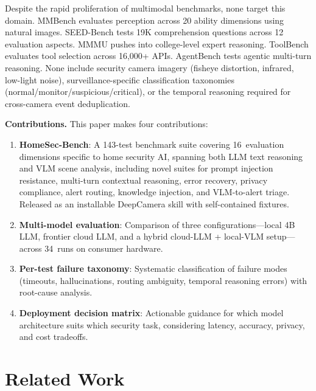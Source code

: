 \documentclass[conference]{IEEEtran}
\begin{document}
Despite the rapid proliferation of multimodal benchmarks, none target
this domain. MMBench \cite{liu2023mmbench} evaluates perception across
20 ability dimensions using natural images. SEED-Bench
\cite{li2023seedbench} tests 19K comprehension questions across 12
evaluation aspects. MMMU \cite{yue2024mmmu} pushes into
college-level expert reasoning. ToolBench \cite{qin2023toolllm} evaluates
tool selection across 16,000+ APIs. AgentBench \cite{liu2023agentbench}
tests agentic multi-turn reasoning. None include security camera imagery
(fisheye distortion, infrared, low-light noise), surveillance-specific
classification taxonomies (normal/monitor/suspicious/critical), or the
temporal reasoning required for cross-camera event deduplication.

\textbf{Contributions.} This paper makes four contributions:
\begin{enumerate}[nosep]
    \item \textbf{HomeSec-Bench}: A 143-test benchmark suite covering
    16~evaluation dimensions specific to home security AI, spanning
    both LLM text reasoning and VLM scene analysis, including novel
    suites for prompt injection resistance, multi-turn contextual
    reasoning, error recovery, privacy compliance, alert routing,
    knowledge injection, and VLM-to-alert triage. Released as an
    installable DeepCamera skill with self-contained fixtures.
    \item \textbf{Multi-model evaluation}: Comparison of three
    configurations---local 4B LLM, frontier cloud LLM, and a hybrid
    cloud-LLM + local-VLM setup---across 34~runs on consumer hardware.
    \item \textbf{Per-test failure taxonomy}: Systematic classification
    of failure modes (timeouts, hallucinations, routing ambiguity,
    temporal reasoning errors) with root-cause analysis.
    \item \textbf{Deployment decision matrix}: Actionable guidance for
    which model architecture suits which security task, considering
    latency, accuracy, privacy, and cost tradeoffs.
\end{enumerate}


\section{Related Work}
\end{document}
